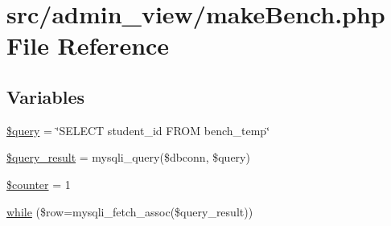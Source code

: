 \hypertarget{makeBench_8php}{\section{src/admin\-\_\-view/make\-Bench.php \-File \-Reference}
\label{makeBench_8php}
}
\subsection*{\-Variables}
\begin{DoxyCompactItemize}
\item 
\hyperlink{makeBench_8php_af59a5f7cd609e592c41dc3643efd3c98}{\$query} = \char`\"{}\-S\-E\-L\-E\-C\-T student\-\_\-id \-F\-R\-O\-M bench\-\_\-temp\char`\"{}
\item 
\hyperlink{makeBench_8php_ade0b3dacf5d65d8f2293ffa78561fe31}{\$query\-\_\-result} = mysqli\-\_\-query(\$dbconn, \$query)
\item 
\hyperlink{makeBench_8php_adc0a189fac719187ba2e6f01ca0f2466}{\$counter} = 1
\item 
\hyperlink{makeBench_8php_abbca5b4e0da1a7b7e95bb777ad93473d}{while} (\$row=mysqli\-\_\-fetch\-\_\-assoc(\$query\-\_\-result))
\end{DoxyCompactItemize}


